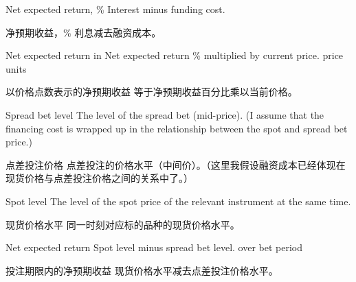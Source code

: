 \bipairgap

\begin{englishblock} Net expected return, \% Interest minus funding cost. \end{englishblock}

\begin{chineseblock}净预期收益，\% 利息减去融资成本。\end{chineseblock}

\bipairgap

\begin{englishblock} Net expected return in Net expected return \% multiplied by current price. price units \end{englishblock}

\begin{chineseblock}以价格点数表示的净预期收益 等于净预期收益百分比乘以当前价格。\end{chineseblock}


\begin{englishblock} Spread bet level The level of the spread bet (mid-price). (I assume that the financing cost is wrapped up in the relationship between the spot and spread bet price.) \end{englishblock}

\begin{chineseblock}点差投注价格 点差投注的价格水平（中间价）。（这里我假设融资成本已经体现在现货价格与点差投注价格之间的关系中了。）\end{chineseblock}

\bipairgap

\begin{englishblock} Spot level The level of the spot price of the relevant instrument at the same time. \end{englishblock}

\begin{chineseblock}现货价格水平 同一时刻对应标的品种的现货价格水平。\end{chineseblock}

\bipairgap

\begin{englishblock} Net expected return Spot level minus spread bet level. over bet period \end{englishblock}

\begin{chineseblock}投注期限内的净预期收益 现货价格水平减去点差投注价格水平。\end{chineseblock}


